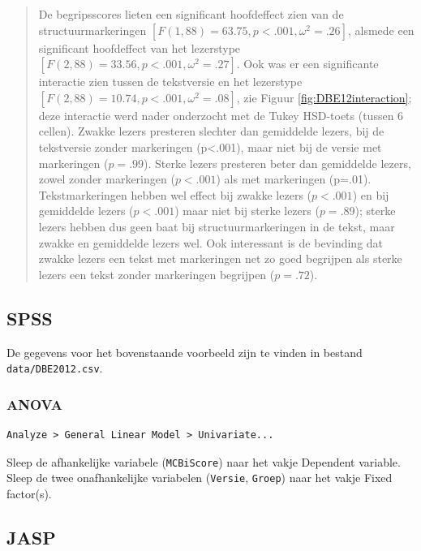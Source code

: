 \documentclass[
]{book}
\begin{document}
\begin{quote}
De begripsscores lieten een significant hoofdeffect zien van de structuurmarkeringen \([F(1,88)=63.75, p<.001, \omega^2=.26]\), alsmede een significant hoofdeffect van het lezerstype \([F(2,88)=33.56, p<.001, \omega^2=.27]\).
Ook was er een significante interactie zien tussen de tekstversie en het lezerstype \([F(2,88)=10.74, p<.001, \omega^2=.08]\), zie Figuur \ref{fig:DBE12interaction}; deze interactie werd nader onderzocht met de Tukey HSD-toets (tussen 6 cellen).
Zwakke lezers presteren slechter dan gemiddelde lezers, bij de tekstversie zonder markeringen (p\textless.001), maar niet bij de versie met markeringen (\(p=.99\)). Sterke lezers presteren beter dan gemiddelde lezers, zowel zonder markeringen (\(p<.001\)) als met markeringen (p=.01). Tekstmarkeringen hebben wel effect bij zwakke lezers (\(p<.001\)) en bij gemiddelde lezers (\(p<.001\)) maar niet bij sterke lezers (\(p=.89\)); sterke lezers hebben dus geen baat bij structuurmarkeringen in de tekst, maar zwakke en gemiddelde lezers wel. Ook interessant is de bevinding dat zwakke lezers een tekst met markeringen net zo goed begrijpen als sterke lezers een tekst zonder markeringen begrijpen (\(p=.72\)).
\end{quote}

\subsection{SPSS}\label{spss-13}

De gegevens voor het bovenstaande voorbeeld zijn te vinden in bestand \texttt{data/DBE2012.csv}.

\subsubsection{ANOVA}\label{anova-3}

\begin{verbatim}
Analyze > General Linear Model > Univariate...
\end{verbatim}

Sleep de afhankelijke variabele (\texttt{MCBiScore}) naar het vakje Dependent
variable. Sleep de twee onafhankelijke variabelen (\texttt{Versie}, \texttt{Groep}) naar het
vakje Fixed factor(s).

\subsection{JASP}\label{jasp-15}
\end{document}
